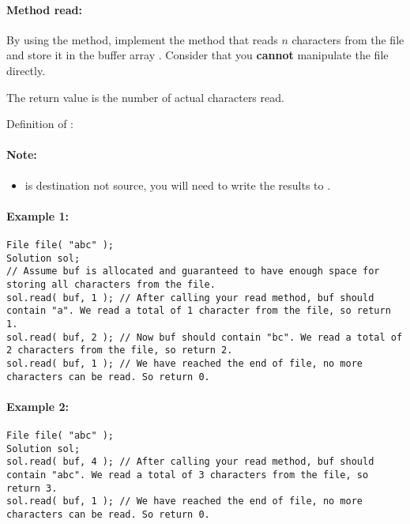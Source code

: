 \paragraph{Method read:}

\begin{flushleft}
By using the  method, implement the method  that reads $n$ characters from the file and store it in the buffer array . Consider that you \textbf{cannot} manipulate the file directly.

The return value is the number of actual characters read.

Definition of : 
\end{flushleft}

\paragraph{Note:} 

\begin{itemize}
\item {} is destination not source, you will need to write the results to .
\end{itemize}


\paragraph{Example 1:}

\begin{lstlisting}[style=customc]
File file( "abc" );
Solution sol;
// Assume buf is allocated and guaranteed to have enough space for storing all characters from the file.
sol.read( buf, 1 ); // After calling your read method, buf should contain "a". We read a total of 1 character from the file, so return 1.
sol.read( buf, 2 ); // Now buf should contain "bc". We read a total of 2 characters from the file, so return 2.
sol.read( buf, 1 ); // We have reached the end of file, no more characters can be read. So return 0.
\end{lstlisting}

\paragraph{Example 2:}
\begin{lstlisting}[style=customc]
File file( "abc" );
Solution sol;
sol.read( buf, 4 ); // After calling your read method, buf should contain "abc". We read a total of 3 characters from the file, so return 3.
sol.read( buf, 1 ); // We have reached the end of file, no more characters can be read. So return 0.
\end{lstlisting}

